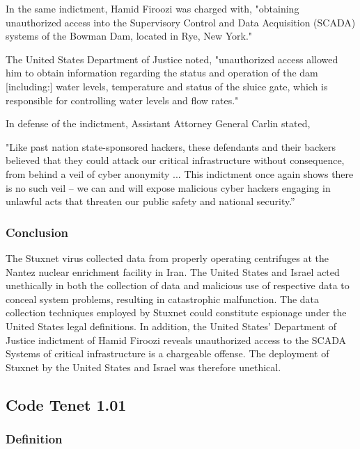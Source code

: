 \documentclass[12pt]{article}
\begin{document}
\begin{multicols}{2}
In the same indictment, Hamid Firoozi was charged with, "obtaining unauthorized access into the Supervisory Control and Data Acquisition (SCADA) systems of the Bowman Dam, located in Rye, New York."\cite{sevenIraniansIndicted}

The United States Department of Justice noted, "unauthorized access allowed him to obtain information regarding the status and operation of the dam [including:] water levels, temperature and status of the sluice gate, which is responsible for controlling water levels and flow rates."\cite{sevenIraniansIndicted}

In defense of the indictment, Assistant Attorney General Carlin stated,

\begin{displayquote}
"Like past nation state-sponsored hackers, these defendants and their backers believed that they could attack our critical infrastructure without consequence, from behind a veil of cyber anonymity ... This indictment once again shows there is no such veil – we can and will expose malicious cyber hackers engaging in unlawful acts that threaten our public safety and national security.”\cite{sevenIraniansIndicted}
\end{displayquote}

\subsubsection{Conclusion}

The Stuxnet virus collected data from properly operating centrifuges at the Nantez nuclear enrichment facility in Iran. The United States and Israel acted unethically in both the collection of data and malicious use of respective data to conceal system problems, resulting in catastrophic malfunction. The data collection techniques employed by Stuxnet could constitute espionage under the United States legal definitions. In addition, the United States' Department of Justice indictment of Hamid Firoozi reveals unauthorized access to the SCADA Systems of critical infrastructure is a chargeable offense. The deployment of Stuxnet by the United States and Israel was therefore unethical.


\subsection{Code Tenet 1.01}

\subsubsection{Definition}


\end{multicols}
\end{document}
